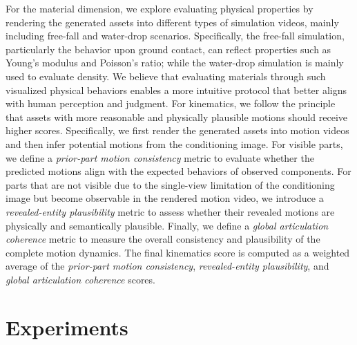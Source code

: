\documentclass[11pt]{article}
\begin{document}
    
For the material dimension, we explore evaluating physical properties by rendering the generated assets into different types of simulation videos, mainly including free-fall and water-drop scenarios.
Specifically, the free-fall simulation, particularly the behavior upon ground contact, can reflect properties such as Young’s modulus and Poisson’s ratio; while the water-drop simulation is mainly used to evaluate density.
We believe that evaluating materials through such visualized physical behaviors enables a more intuitive protocol that better aligns with human perception and judgment.
For kinematics, we follow the principle that assets with more reasonable and physically plausible motions should receive higher scores. Specifically, we first render the generated assets into motion videos and then infer potential motions from the conditioning image. For visible parts, we define a \textit{prior-part motion consistency} metric to evaluate whether the predicted motions align with the expected behaviors of observed components. 
For parts that are not visible due to the single-view limitation of the conditioning image but become observable in the rendered motion video, we introduce a \textit{revealed-entity plausibility} metric to assess whether their revealed motions are physically and semantically plausible.
Finally, we define a \textit{global articulation coherence} metric to measure the overall consistency and plausibility of the complete motion dynamics. 
The final kinematics score is computed as a weighted average of the \textit{prior-part motion consistency}, \textit{revealed-entity plausibility}, and \textit{global articulation coherence} scores.




\section{Experiments}
\end{document}
